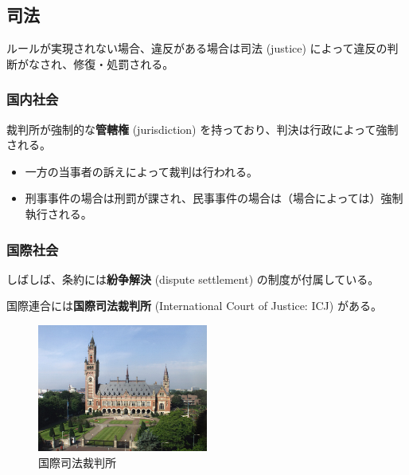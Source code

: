 \documentclass[
  xelatex,
  ja=standard]{bxjsarticle}
\providecommand{\tightlist}{%
  \setlength{\itemsep}{0pt}\setlength{\parskip}{0pt}}\usepackage{longtable,booktabs,array}
\begin{document}
\hypertarget{ux53f8ux6cd5}{%
\subsection{司法}\label{ux53f8ux6cd5}}

ルールが実現されない場合、違反がある場合は司法 (justice)
によって違反の判断がなされ、修復・処罰される。

\hypertarget{ux56fdux5185ux793eux4f1a-2}{%
\subsubsection{国内社会}\label{ux56fdux5185ux793eux4f1a-2}}

裁判所が強制的な\textbf{管轄権} (jurisdiction)
を持っており、判決は行政によって強制される。

\begin{itemize}
\tightlist
\item
  一方の当事者の訴えによって裁判は行われる。
\item
  刑事事件の場合は刑罰が課され、民事事件の場合は（場合によっては）強制執行される。
\end{itemize}

\hypertarget{ux56fdux969bux793eux4f1a-2}{%
\subsubsection{国際社会}\label{ux56fdux969bux793eux4f1a-2}}

しばしば、条約には\textbf{紛争解決} (dispute settlement)
の制度が付属している。

国際連合には\textbf{国際司法裁判所} (International Court of Justice:
ICJ) がある。

\begin{figure}[htpb]

{\centering \includegraphics[width=0.5\textwidth,height=\textheight]{international_society_files/mediabag/International_Court_.jpg}

}

\caption{国際司法裁判所}

\end{figure}
\end{document}
